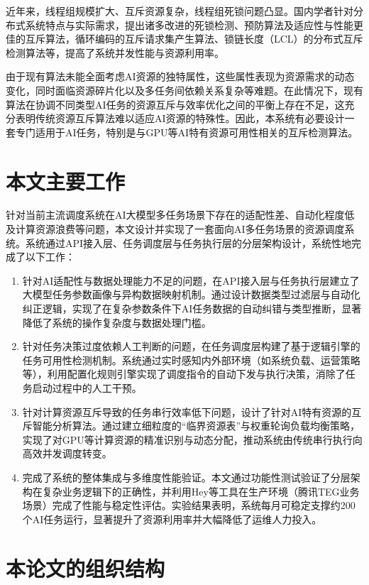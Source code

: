 近年来，线程组规模扩大、互斥资源复杂，线程组死锁问题凸显。国内学者针对分布式系统特点与实际需求，提出诸多改进的死锁检测、预防算法及适应性与性能更佳的互斥算法，循环编码的互斥请求集产生算法\cite{DZXU200508011}、锁链长度（LCL）的分布式互斥检测算法\cite{yang2023lcl}等，提高了系统并发性能与资源利用率。

由于现有算法未能全面考虑AI资源的独特属性，这些属性表现为资源需求的动态变化，同时面临资源碎片化以及多任务间依赖关系复杂等难题。在此情况下，现有算法在协调不同类型AI任务的资源互斥与效率优化之间的平衡上存在不足，这充分表明传统资源互斥算法难以适应AI资源的特殊性。因此，本系统有必要设计一套专门适用于AI任务，特别是与GPU等AI特有资源可用性相关的互斥检测算法。 

\section{本文主要工作}

针对当前主流调度系统在AI大模型多任务场景下存在的适配性差、自动化程度低及计算资源浪费等问题，本文设计并实现了一套面向AI多任务场景的资源调度系统。系统通过API接入层、任务调度层与任务执行层的分层架构设计，系统性地完成了以下工作：

\begin{enumerate}
    \item 针对AI适配性与数据处理能力不足的问题，在API接入层与任务执行层建立了大模型任务参数画像与异构数据映射机制。通过设计数据类型过滤层与自动化纠正逻辑，实现了在复杂参数条件下AI任务数据的自动纠错与类型推断，显著降低了系统的操作复杂度与数据处理门槛。
    \item 针对任务决策过度依赖人工判断的问题，在任务调度层构建了基于逻辑引擎的任务可用性检测机制。系统通过实时感知内外部环境（如系统负载、运营策略等），利用配置化规则引擎实现了调度指令的自动下发与执行决策，消除了任务启动过程中的人工干预。
    \item 针对计算资源互斥导致的任务串行效率低下问题，设计了针对AI特有资源的互斥智能分析算法。通过建立细粒度的“临界资源表”与权重轮询负载均衡策略，实现了对GPU等计算资源的精准识别与动态分配，推动系统由传统串行执行向高效并发调度转变。
    \item 完成了系统的整体集成与多维度性能验证。本文通过功能性测试验证了分层架构在复杂业务逻辑下的正确性，并利用Hey等工具在生产环境（腾讯TEG业务场景）完成了性能与稳定性评估。实验结果表明，系统每月可稳定支撑约200个AI任务运行，显著提升了资源利用率并大幅降低了运维人力投入。
\end{enumerate}

\section{本论文的组织结构}

